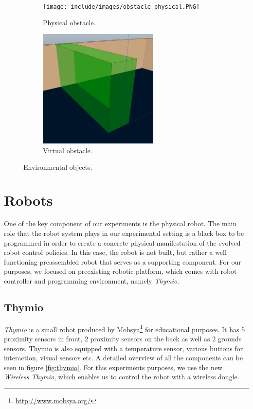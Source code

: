 \begin{figure}[h]
    \centering
    \begin{subfigure}[b]{0.4\textwidth}
    	\centering
        \texttt{[image: include/images/obstacle\_physical.PNG]}
        \caption{Physical obstacle.}
        \label{fig:physical_obstacle}
    \end{subfigure}
    \begin{subfigure}[b]{0.4\textwidth}
    	\centering
        \includegraphics[width=6cm]{include/images/obstacle_virtual.PNG}
        \caption{Virtual obstacle.}
        \label{fig:virtual_obstacle}
    \end{subfigure}
    \caption{Environmental objects.}\label{sistemass1}
\end{figure}

\section{Robots}

One of the key component of our experiments is the physical robot. The main role that the robot system plays in our experimental setting is a black box to be programmed in order to create a concrete physical manifestation of the evolved robot control policies. In this case, the robot is not built, but rather a well functioning preassembled robot that serves as a supporting component. For our purposes, we focused on preexisting robotic platform, which comes with robot controller and programming environment, namely \emph{Thymio}.

\subsection{Thymio}

\emph{Thymio} \citep{mondada2017thymio} is a small robot produced by Mobsya\footnote{\url{http://www.mobsya.org/}} for educational purposes. It has 5 proximity sensors in front, 2 proximity sensors on the back as well as 2 grounds sensors. Thymio is also equipped with a temperature sensor, various buttons for interaction, visual sensors etc. A detailed overview of all the components can be seen in figure \ref{fig:thymio}. For this experiments purposes, we use the new \emph{Wireless Thymio}, which enables us to control the robot with a wireless dongle.

